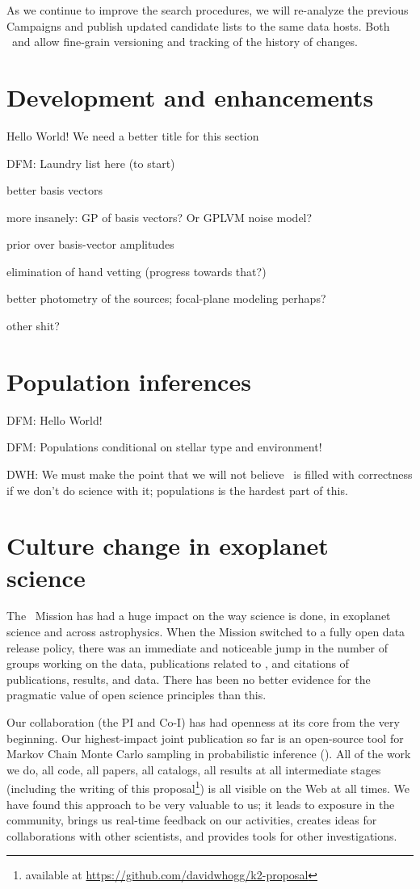 \documentclass[12pt,preprint]{aastex}
\newcommand{\github}{\project{GitHub}}
\begin{document}
As we continue to improve the search procedures, we will re-analyze the
previous Campaigns and publish updated candidate lists to the same data hosts.
Both \github\ and  allow fine-grain versioning and tracking
of the history of changes.


\section{Development and enhancements}

Hello World!  We need a better title for this section

DFM:  Laundry list here (to start)

better basis vectors

more insanely: GP of basis vectors?  Or GPLVM noise model?

prior over basis-vector amplitudes

elimination of hand vetting (progress towards that?)

better photometry of the sources; focal-plane modeling perhaps?

other shit?

\section{Population inferences}

DFM:  Hello World!

DFM:  Populations conditional on stellar type and environment!

DWH:  We must make the point that we will not believe \thecatalog\ is filled
with correctness if we don't do science with it; populations is the hardest
part of this.

\section{Culture change in exoplanet science}

The \kepler\ Mission has had a huge impact on the way science is done,
in exoplanet science and across astrophysics.
When the Mission switched to a fully open data release policy, there
was an immediate and noticeable jump in the number of groups working on
the data, publications related to \kepler, and citations of \kepler
publications, results, and data.
There has been no better evidence for the pragmatic value of open
science principles than this.

Our collaboration (the PI and Co-I) has had openness at its core from
the very beginning.
Our highest-impact joint publication so far is an open-source tool for
Markov Chain Monte Carlo sampling in probabilistic inference (\citealt{emcee}).
All of the work we do, all code, all papers, all catalogs, all results
at all intermediate stages (including the writing of this
proposal\footnote{available at
  \url{https://github.com/davidwhogg/k2-proposal}}) is all visible on
the Web at all times.
We have found this approach to be very valuable to us; it leads to
exposure in the community, brings us real-time feedback on our
activities, creates ideas for collaborations with other scientists,
and provides tools for other investigations.
\end{document}
